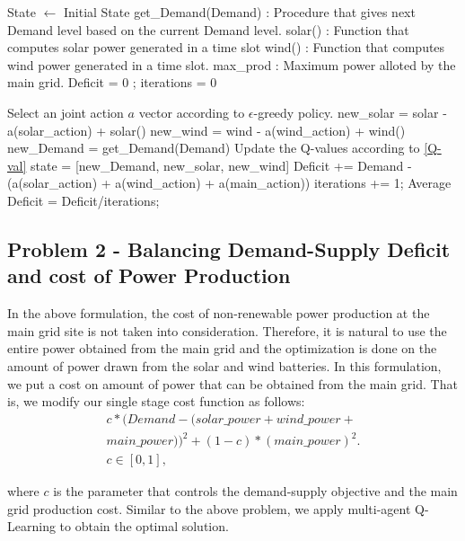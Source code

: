 \documentclass[conference]{IEEEtran}
\begin{document}
\begin{algorithm}
\caption{}
\label{q-learning}
\begin{algorithmic}[1]
	\State  State $\leftarrow$ Initial State 
    \State get\_Demand(Demand) : Procedure that gives next Demand level based on the current Demand level.
   \State solar() : Function that computes solar power generated in a time slot
    \State wind() : Function that computes wind power generated in a time slot.
    \State max\_prod : Maximum power alloted by the main grid.
    \State Deficit = 0 ; iterations = 0
     
     \State Select an joint action $a$ vector according to $\epsilon$-greedy policy.
     \State new\_solar = solar - a(solar\_action) + solar()
     \State new\_wind = wind - a(wind\_action) + wind()
     \State new\_Demand = get\_Demand(Demand)
     \State Update the Q-values according to \eqref{Q-val}
     \State state = [new\_Demand, new\_solar, new\_wind]
     \State Deficit += Demand - (a(solar\_action) + a(wind\_action) + a(main\_action))
     \State iterations += 1;
    \EndProcedure
    \State Average Deficit = Deficit/iterations;
\end{algorithmic}
\end{algorithm}


\subsection{Problem 2 - Balancing Demand-Supply Deficit and cost of Power Production}
In the above formulation, the cost of non-renewable power production at the main grid site is not taken into consideration. Therefore, it is natural to use the entire power obtained from the main grid and the optimization is done on the amount of power drawn from the solar and wind batteries. In this formulation, we put a cost on amount of power that can be obtained from the main grid. That is, we modify our single stage cost function as follows:
\begin{equation}\label{prob2}
\begin{split}
 c*(Demand - (solar\_power + wind\_power+ \\
 main\_power))^2+(1-c)*(main\_power)^2.\\
 c \in[0,1],
 \end{split}
\end{equation}


where $c$ is the parameter that controls the demand-supply objective and the main grid production cost. 
Similar to the above problem, we apply multi-agent Q-Learning to obtain the optimal solution. 
\end{document}
